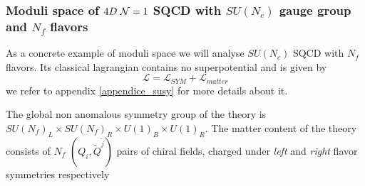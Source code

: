 \subsubsection{Moduli space of $4D \; \mathcal{N}=1$ SQCD with $SU(N_c)$ gauge group and $N_f$ flavors}
As a concrete example of moduli space we will analyse $SU(N_c)$ SQCD with $N_f$ flavors.
Its classical lagrangian contains no superpotential and is given by
\begin{equation}
\mathcal{L } =  \mathcal{L }_{SYM} + \mathcal{L }_{matter} 
\end{equation}
we refer to appendix \ref{appendice_susy} for more details about it.

The global non anomalous symmetry group of the theory is $SU(N_f)_L \times SU(N_f)_R \times U(1)_B \times U(1)_R$. 
The matter content of the theory consists of $N_f$ $(Q_i, \tilde{Q}^{\tilde{j}})$ pairs of chiral fields, charged under \emph{left} and \emph{right} flavor symmetries respectively  





